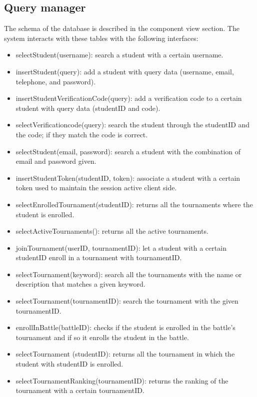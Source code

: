 \documentclass[12pt, a4paper]{report}
\begin{document}
    \subsection{Query manager}
    The schema of the database is described in the component view section. 
    The system interacts with these tables with the following interfaces: 
    \begin{itemize}
        \item selectStudent(username): search a student with a certain username. 
        \item insertStudent(query): add a student with query data (username, email, telephone, and password).
        \item insertStudentVerificationCode(query): add a verification code to a certain student with query data (studentID and code). 
        \item selectVerificationcode(query): search the student through the studentID and the code; if they match the code is correct. 
        \item selectStudent(email, password): search a student with the combination of email and password given. 
        \item insertStudentToken(studentID, token): associate a student with a certain token used to maintain the session active client side. 
        \item selectEnrolledTournament(studentID): returns all the tournaments where the student is enrolled. 
        \item selectActiveTournaments(): returns all the active tournaments. 
        \item joinTournament(userID, tournamentID): let a student with a certain studentID enroll in a tournament with tournamentID. 
        \item selectTournament(keyword): search all the tournaments with the name or description that matches a given keyword. 
        \item selectTournament(tournamentID): search the tournament with the given tournamentID. 
        \item enrollInBattle(battleID): checks if the student is enrolled in the battle's tournament and if so it enrolls the student in the battle. 
        \item selectTournament (studentID): returns all the tournament in which the student with studentID is enrolled. 
        \item selectTournamentRanking(tournamentID): returns the ranking of the tournament with a certain tournamentID. 

\end{itemize}
\end{document}
